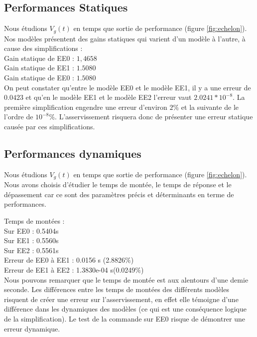\subsection{Performances Statiques}
Nous étudions $V_g(t)$ en temps que sortie de performance (figure \ref{fig:echelon}).\\
Nos modèles présentent des gains statiques qui varient d'un modèle à l'autre, à cause des simplifications : \\

\noindent Gain statique de EE0 : $1,4658$\\

\noindent Gain statique de EE1 : $1.5080$\\

\noindent Gain statique de EE0 : $1.5080$\\

On peut constater qu'entre le modèle EE0 et le modèle EE1, il y a une erreur de $0.0423$ et qu'en le modèle EE1 et le modèle EE2 l'erreur vaut $2.0241*10^{-8}$. La première simplification engendre une erreur d'environ $2\%$ et la suivante de le l'ordre de $10^{-8}\%$. L'asservissement risquera donc de présenter une erreur statique causée par ces simplifications.

\subsection{Performances dynamiques}
Nous étudions $V_g(t)$ en temps que sortie de performance (figure \ref{fig:echelon}).\\
Nous avons choisis d'étudier le temps de montée, le temps de réponse et le dépassement car ce sont des paramètres précis et déterminants en terme de performances. 

\noindent Temps de montées :\\
\noindent Sur EE0 : 0.5404s \\
\noindent Sur EE1 : 0.5560s\\
\noindent Sur EE2 : 0.5561s\\
\noindent Erreur de EE0 à EE1 : 0.0156 s (2.8826$\%$)\\
\noindent Erreur de EE1 à EE2 : 1.3830e-04 s(0.0249$\%$)\\
Nous pouvons remarquer que le temps de montée est aux alentours d'une demie seconde. Les différences entre les temps de montées des différents modèles risquent de créer une erreur sur l'asservissement, en effet elle témoigne d'une différence dans les dynamiques des modèles (ce qui est une conséquence logique de la simplification). Le test de la commande sur EE0 risque de démontrer une erreur dynamique.\\

